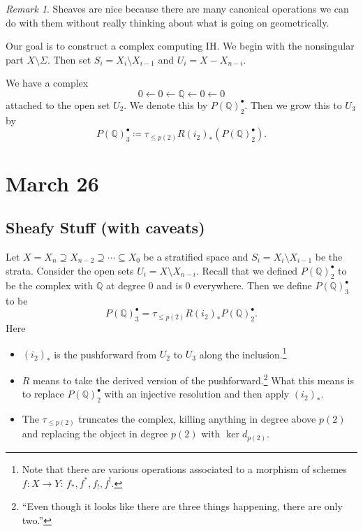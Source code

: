 \documentclass[leqno, openany]{memoir}
\theoremstyle{definition}
\theoremstyle{remark}
\newtheorem{rmk}[thm]{Remark}
\theoremstyle{plain}
\theoremstyle{definition}
\theoremstyle{remark}
\newcommand{\Q}{\mathbb{Q}}
\begin{document}
\begin{rmk}
    Sheaves are nice because there are many canonical operations we can do with them without really thinking about what is going on geometrically.
\end{rmk}

Our goal is to construct a complex computing IH. We begin with the nonsingular part $X \setminus \Sigma$. Then set $S_i = X_i \setminus X_{i-1}$ and $U_i = X - X_{n-i}$. 

We have a complex 
\[ 0 \gets 0 \gets \Q \gets 0 \gets 0 \]
attached to the open set $U_2$. We denote this by $P(\Q)_2^{\bullet}$. Then we grow this to $U_3$ by
\[ P(\Q)_3^{\bullet} \coloneqq \tau_{\leq p(2)} R ( i_2 )_*(P(\Q)_2^{\bullet}). \]

\chapter{March 26}%
\label{cha:march_26}

\section{Sheafy Stuff (with caveats)}%
\label{sec:sheafy_stuff_with_caveats_}

Let $X = X_n \supseteq X_{n-2} \supseteq \cdots \subseteq X_0$ be a stratified space and $S_i = X_i \setminus X_{i-1}$ be the strata. Consider the open sets $U_i = X \setminus X_{n-i}$. Recall that we defined $P(\Q)_2^{\bullet}$ to be the complex with $\Q$ at degree $0$ and is $0$ everywhere. Then we define $P(\Q)_3^{\bullet}$ to be
\[ P(\Q)_3^{\bullet} = \tau_{\leq p(2)} R (i_2)_* P(\Q)_2^{\bullet}. \]
Here
\begin{itemize}
    \item $(i_2)_*$ is the pushforward from $U_2$ to $U_3$ along the inclusion.\footnote{Note that there are various operations associated to a morphism of schemes $f:X \to Y$: $f_*, f^*, f_!, f^!$.}
    \item $R$ means to take the derived version of the pushforward.\footnote{``Even though it looks like there are three things happening, there are only two.''} What this means is to replace $P(\Q)_2^{\bullet}$ with an injective resolution and then apply $(i_2)_*$.
    \item The $\tau_{\leq p(2)}$ truncates the complex, killing anything in degree above $p(2)$ and replacing the object in degree $p(2)$ with $\ker d_{p(2)}$.
\end{itemize}
\end{document}
